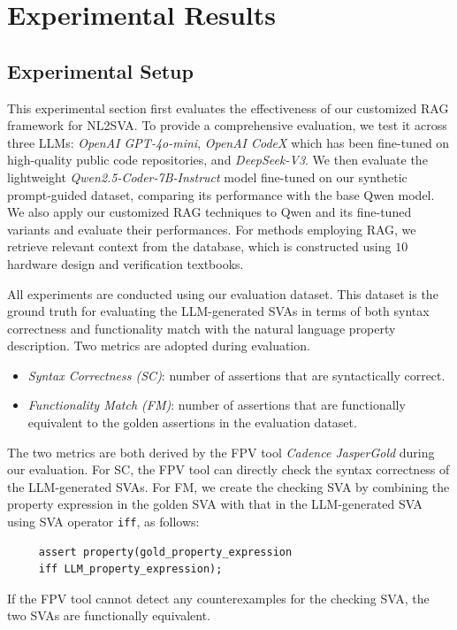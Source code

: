 \section{Experimental Results} \label{sec:exp}
\subsection{Experimental Setup}
\label{subsec:experimental-setup}
This experimental section first evaluates the effectiveness of our customized RAG framework for NL2SVA. 
To provide a comprehensive evaluation, we test  it across three LLMs: \textit{OpenAI GPT-4o-mini}, \textit{OpenAI CodeX} which has been fine-tuned on high-quality public code repositories, and \textit{DeepSeek-V3}.
We then evaluate the lightweight \textit{Qwen2.5-Coder-7B-Instruct} model fine-tuned on our synthetic prompt-guided dataset, comparing its performance with the base Qwen model.
We also apply our customized RAG techniques to Qwen and its fine-tuned variants and evaluate their performances.
For methods employing RAG, we retrieve relevant context from the database, which is constructed using $10$ hardware design and verification textbooks.

All experiments are conducted using our evaluation dataset. 
This dataset is the ground truth for evaluating the LLM-generated SVAs in terms of both syntax correctness and functionality match with the natural language property description. 
Two metrics are adopted during evaluation.
\begin{itemize}
    \item \textit{Syntax Correctness (SC)}: number of assertions that are syntactically correct.
    \item \textit{Functionality Match (FM)}: number of assertions that are functionally equivalent to the golden assertions in the evaluation dataset.
\end{itemize}
The two metrics are both derived by the FPV tool \textit{Cadence JasperGold} during our evaluation.
For SC, the FPV tool can directly check the syntax correctness of the LLM-generated SVAs.
For FM, we create the checking SVA by combining the property expression in the golden SVA with that in the LLM-generated SVA using SVA operator \texttt{iff}, as follows:
\begin{verbatim}
     assert property(gold_property_expression 
     iff LLM_property_expression);
\end{verbatim}
If the FPV tool cannot detect any counterexamples for the checking SVA, the two SVAs are functionally equivalent.

